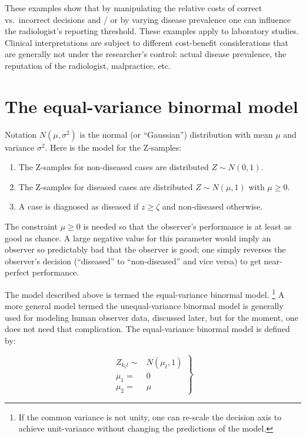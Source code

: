 \documentclass[
]{book}
\begin{document}
These examples show that by manipulating the relative costs of correct vs.~incorrect decisions and / or by varying disease prevalence one can influence the radiologist's reporting threshold. These examples apply to laboratory studies. Clinical interpretations are subject to different cost-benefit considerations that are generally not under the researcher's control: actual disease prevalence, the reputation of the radiologist, malpractice, etc.

\hypertarget{binary-task-model-equal-variance-binormal-model}{%
\section{The equal-variance binormal model}\label{binary-task-model-equal-variance-binormal-model}}

Notation \(N(\mu,\sigma^2)\) is the normal (or ``Gaussian'') distribution with mean \(\mu\) and variance \(\sigma^2\). Here is the model for the Z-samples:

\begin{enumerate}
\def\labelenumi{\arabic{enumi}.}
\item
  The Z-samples for non-diseased cases are distributed \(Z \sim N(0,1)\).
\item
  The Z-samples for diseased cases are distributed \(Z \sim N(\mu,1)\) with \(\mu \ge 0\).
\item
  A case is diagnosed as diseased if \(z \ge \zeta\) and non-diseased otherwise.
\end{enumerate}

The constraint \(\mu \ge 0\) is needed so that the observer's performance is at least as good as chance. A large negative value for this parameter would imply an observer so predictably bad that the observer is good; one simply reverses the observer's decision (``diseased'' to ``non-diseased'' and vice versa) to get near-perfect performance.

The model described above is termed the equal-variance binormal model. \footnote{If the common variance is not unity, one can re-scale the decision axis to achieve unit-variance without changing the predictions of the model.} A more general model termed the unequal-variance binormal model is generally used for modeling human observer data, discussed later, but for the moment, one does not need that complication. The equal-variance binormal model is defined by:

\begin{equation} 
\left.
\begin{aligned}  
Z_{k_tt} \sim& N(\mu_t,1) \\ 
\mu_1=& 0\\ 
\mu_2=& \mu
\end{aligned}
\right \}
\label{eq:binary-task-model-equal-variance}
\end{equation}
\end{document}
